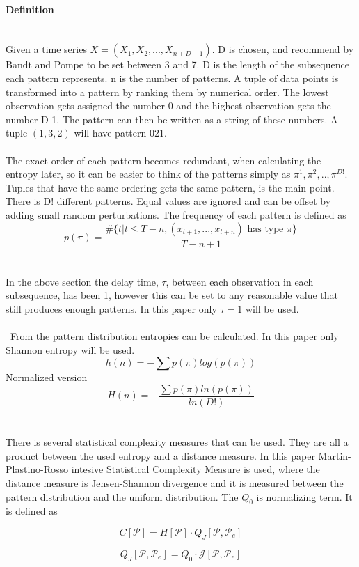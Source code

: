 \paragraph{Definition}\\
Given a time series $X=(X_1,X_2,...,X_{n+D-1})$. D is chosen, and recommend by Bandt and Pompe to be set between 3 and 7. D is the length of the subsequence each pattern represents. n is the number of patterns. A tuple of data points is transformed into a pattern by ranking them by numerical order. The lowest observation gets assigned the number 0 and the highest observation gets the number D-1. The pattern can then be written as a string of these numbers. A tuple $(1,3,2)$ will have pattern 021. 
\\\\
The exact order of each pattern becomes redundant, when calculating the entropy later, so it can be easier to think of the patterns simply as $\pi^1,\pi^2,..,\pi^{D!}$. Tuples that have the same ordering gets the same pattern, is the main point. There is D! different patterns. Equal values are ignored and can be offset by adding small random perturbations. The frequency of each pattern is defined as
$$p(\pi)=\frac{\#\{t|t\leq T-n,(x_{t+1},...,x_{t+n}) \mbox{ has type }\pi\}}{T-n+1}$$
\cite{Bandt2002}
\\\\
In the above section the delay time, $\tau$, between each observation in each subsequence, has been 1, however this can be set to any reasonable value that still produces enough patterns. In this paper only $\tau=1$ will be used.
\\\\\
From the pattern distribution entropies can be calculated. In this paper only Shannon entropy will be used. 
$$h(n)=-\sum p(\pi) log(p(\pi))$$
Normalized version
$$H(n)=-\frac{\sum p(\pi) ln(p(\pi))}{ln(D!)}$$
\\\\
There is several statistical complexity measures that can be used. They are all a product between the used entropy and a distance measure. In this paper Martin-Plastino-Rosso intesive Statistical Complexity Measure is used, where the distance measure is Jensen-Shannon divergence and it is measured between the pattern distribution and the uniform distribution. The $Q_0$ is normalizing term. It is defined as

$$C[\mathscr{P}]=H[\mathscr{P}]\cdot Q_J[\mathscr{P},\mathscr{P}_e]$$

$$Q_J[\mathscr{P},\mathscr{P}_e]=Q_0\cdot \mathscr{J}[\mathscr{P},\mathscr{P}_e]$$

